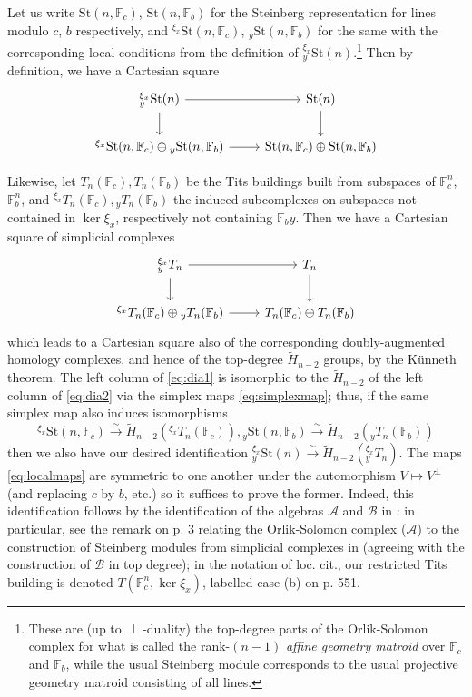 \documentclass[10pt]{amsart}
\theoremstyle{definition}
\newcommand{\F}{\mathbb{F}}
\newcommand{\St}{\mathrm{St}}
\numberwithin{equation}{section}
\begin{document}
Let us write $\St(n,\F_c)$, $\St(n,\F_b)$ for the Steinberg representation for lines modulo $c$, $b$ respectively, and ${}^{\xi_x}\St(n,\F_c)$, ${}_y\St(n,\F_b)$ for the same with the corresponding local conditions from the definition of ${}^{\xi_x}_y\St(n)$.\footnote{These are (up to $\perp$-duality) the top-degree parts of the Orlik-Solomon complex for what is called the rank-$(n-1)$ \emph{affine geometry matroid} over $\F_c$ and $\F_b$, while the usual Steinberg module corresponds to the usual projective geometry matroid consisting of all lines.} Then by definition, we have a Cartesian square 
\begin{equation} \label{eq:dia1}
    \begin{tikzcd}
        {}^{\xi_x}_y\St(n) \arrow[r] \arrow[d] & \St(n) \arrow[d] \\
        {}^{\xi_x}\St(n,\F_c) \oplus {}_y\St(n,\F_b) \arrow[r] & \St(n,\F_c) \oplus \St(n,\F_b)
    \end{tikzcd}
\end{equation}

Likewise, let $T_n(\F_c),T_n(\F_b)$ be the Tits buildings built from subspaces of $\F_c^n$, $\F_b^n$, and ${}^{\xi_x}T_n(\F_c), {}_yT_n(\F_b)$ the induced subcomplexes on subspaces not contained in $\ker \xi_x$, respectively not containing $\F_by$. Then we have a Cartesian square of simplicial complexes
\begin{equation} \label{eq:dia2}
    \begin{tikzcd}
        {}^{\xi_x}_yT_n \arrow[r] \arrow[d] & T_n \arrow[d] \\
        {}^{\xi_x}T_n(\F_c) \oplus {}_yT_n(\F_b) \arrow[r] & T_n(\F_c) \oplus T_n(\F_b)
    \end{tikzcd}
\end{equation}
which leads to a Cartesian square also of the corresponding doubly-augmented homology complexes, and hence of the top-degree $\widetilde{H}_{n-2}$ groups, by the Künneth theorem. The left column of \eqref{eq:dia1} is isomorphic to the $\widetilde{H}_{n-2}$ of the left column of \eqref{eq:dia2} via the simplex maps \eqref{eq:simplexmap}; thus, if the same simplex map also induces isomorphisms
\begin{equation} \label{eq:localmaps}
{}^{\xi_x}\St(n,\F_c)\xrightarrow{\sim} \widetilde{H}_{n-2}({}^{\xi_x}T_n(\F_c)), {}_y\St(n,\F_b)\xrightarrow{\sim} \widetilde{H}_{n-2}({}_yT_n(\F_b))
\end{equation}
then we also have our desired identification ${}^{\xi_x}_y\St(n)\xrightarrow{\sim} \widetilde{H}_{n-2}({}^{\xi_x}_yT_n)$. The maps \eqref{eq:localmaps} are symmetric to one another under the automorphism $V\mapsto V^\perp$ (and replacing $c$ by $b$, etc.) so it suffices to prove the former. Indeed, this identification follows by the identification of the algebras $\mathscr{A}$ and $\mathscr{B}$ in \cite{OS}: in particular, see the remark on p. 3 relating the Orlik-Solomon complex ($\mathscr{A}$) to the construction of Steinberg modules from simplicial complexes in \cite{L} (agreeing with the construction of $\mathscr{B}$ in top degree); in the notation of loc. cit., our restricted Tits building is denoted $T(\F_c^n, \ker \xi_x)$, labelled case (b) on p. 551. 

\printbibliography
\end{document}
